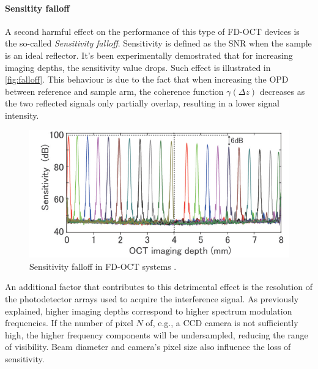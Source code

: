 \paragraph{Sensitity falloff}
A second harmful effect on the performance of this type of FD-OCT devices is the so-called \emph{Sensitivity falloff}. Sensitivity is defined as the \ac{SNR} when the sample is an ideal reflector. It's been experimentally demostrated that for increasing imaging depths, the sensitivity value drops. Such effect is illustrated in \autoref{fig:falloff}. This behaviour is due to the fact that when increasing the \ac{OPD} between reference and sample arm, the coherence function $\gamma(\Delta z)$ decreases as the two reflected signals only partially overlap, resulting in a lower signal intensity. 

\begin{figure}[bth]
	\myfloatalign
	\includegraphics[width=\linewidth]{gfx/ch2/falloff}
	\caption{Sensitivity falloff in \ac{FD-OCT} systems \cite{Choi2012}.}\label{fig:falloff}
\end{figure}


An additional factor that contributes to this detrimental effect is the resolution of the photodetector arrays used to acquire the interference signal. As previously explained, higher imaging depths correspond to higher spectrum modulation frequencies. If the number of pixel $N$ of, e.g., a \ac{CCD} camera is not sufficiently high, the higher frequency components will be undersampled, reducing the range of visibility. Beam diameter and camera's pixel size also influence the loss of sensitivity. 

